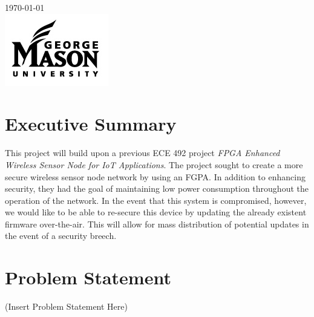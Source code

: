 \documentclass[11pt]{article}
\begin{document}
\begin{titlepage}

{\large \today}\\[2cm] %


\includegraphics{watermark.jpg}\\[1cm] %
 

\vfill %

\end{titlepage}

\section{Executive Summary}

This project will build upon a previous ECE 492 project \textit{FPGA Enhanced Wireless Sensor Node for IoT Applications}. The project sought to create a more secure wireless sensor node network by using an FGPA. In addition to enhancing security, they had the goal of maintaining low power consumption throughout the operation of the network. In the event that this system is compromised, however, we would like to be able to re-secure this device by updating the already existent firmware over-the-air. This will allow for mass distribution of potential updates in the event of a security breech.
\section{Problem Statement}

(Insert Problem Statement Here)
\end{document}
